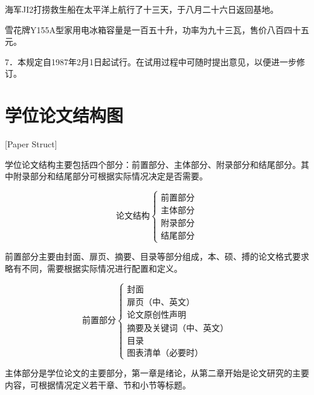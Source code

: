 海军JI2打捞救生船在太平洋上航行了十三天，于八月二十六日返回基地。


雪花牌Y155A型家用电冰箱容量是一百五十升，功率为九十三瓦，售价八百四十五元。



7．本规定自1987年2月1日起试行。在试用过程中可随时提出意见，以便进一步修订。

\chapter{学位论文结构图}[Paper Struct]

学位论文结构主要包括四个部分：前置部分、主体部分、附录部分和结尾部分。其中附录部分和结尾部分可根据实际情况决定是否需要。

\[
    \text{论文结构}
    \begin{cases}
        \text{前置部分} \\
        \text{主体部分} \\
        \text{附录部分} \\
        \text{结尾部分}
    \end{cases}
\]

前置部分主要由封面、扉页、摘要、目录等部分组成，本、硕、搏的论文格式要求略有不同，需要根据实际情况进行配置和定义。

\[
    \text{前置部分}
    \begin{cases}
        \text{封面}                     \\
        \text{扉页（中、英文）}         \\
        \text{论文原创性声明}           \\
        \text{摘要及关键词（中、英文）} \\
        \text{目录}                     \\
        \text{图表清单（必要时）}
    \end{cases}
\]

主体部分是学位论文的主要部分，第一章是绪论，从第二章开始是论文研究的主要内容，可根据情况定义若干章、节和小节等标题。

